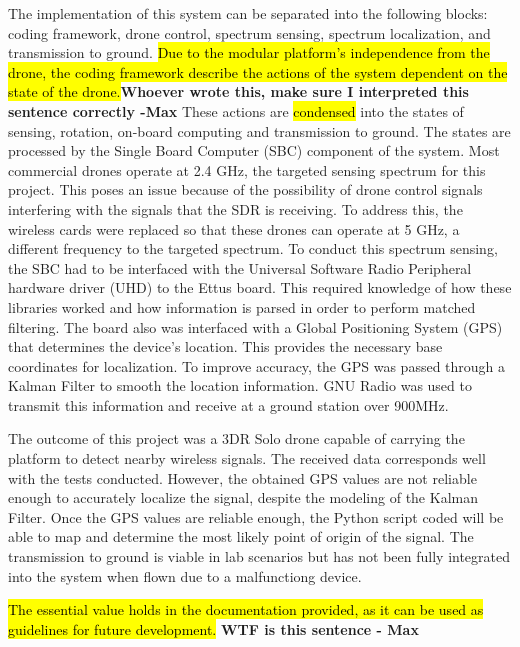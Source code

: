 The implementation of this system can be separated into the following blocks: coding framework, drone control, spectrum sensing, spectrum localization, and transmission to ground. \hl{Due to the modular platform's independence from the drone, the coding framework describe the actions of the system dependent on the state of the drone.}\textbf{Whoever wrote this, make sure I interpreted this sentence correctly -Max} These actions are \hl{condensed} into the states of sensing, rotation, on-board computing and transmission to ground. The states are processed by the Single Board Computer (SBC) component of the system. Most commercial drones operate at 2.4 GHz, the targeted sensing spectrum for this project. This poses an issue because of the possibility of drone control signals interfering with the signals that the SDR is receiving. To address this, the wireless cards were replaced so that these drones can operate at 5 GHz, a different frequency to the targeted spectrum. To conduct this spectrum sensing, the SBC had to be interfaced with the Universal Software Radio Peripheral hardware driver (UHD) to the Ettus board. This required knowledge of how these libraries worked and how information is parsed in order to perform matched filtering. The board also was interfaced with a Global Positioning System (GPS) that determines the device's location. This provides the necessary base coordinates for localization. To improve accuracy, the GPS was passed through a Kalman Filter to smooth the location information. GNU Radio was used to transmit this information and receive at a ground station over 900MHz. \par

The outcome of this project was a 3DR Solo drone capable of carrying the platform to detect nearby wireless signals. The received data corresponds well with the tests conducted. However, the obtained GPS values are not reliable enough to accurately localize the signal, despite the modeling of the Kalman Filter. Once the GPS values are reliable enough, the Python script coded will be able to map and determine the most likely point of origin of the signal. The transmission to ground is viable in lab scenarios but has not been fully integrated into the system when flown due to a malfunctiong device. \par

\hl{The essential value holds in the documentation provided, as it can be used as guidelines for future development.} \textbf{WTF is this sentence - Max}
